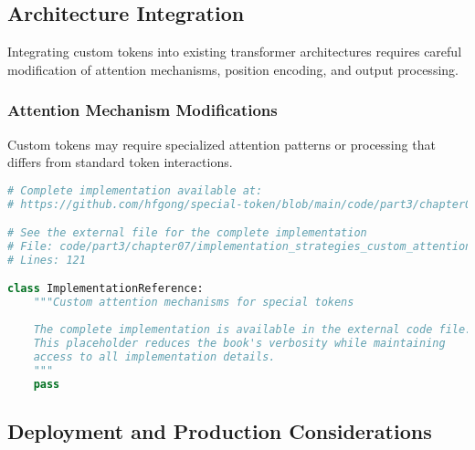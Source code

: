 \subsection{Architecture Integration}

Integrating custom tokens into existing transformer architectures requires careful modification of attention mechanisms, position encoding, and output processing.

\subsubsection{Attention Mechanism Modifications}

Custom tokens may require specialized attention patterns or processing that differs from standard token interactions.
\begin{comment}
Feedback: A brief explanation of what this means would be helpful. For example: "Sometimes, a custom token needs to behave differently in the attention mechanism. For instance, you might design a 'memory' token that can attend to all other tokens but that no other token can attend to. This requires modifying the attention mask to create a one-way information flow, allowing the token to aggregate information without broadcasting its own state."
\end{comment}

\begin{lstlisting}[language=Python, caption={Custom attention mechanisms for special tokens}]
# Complete implementation available at:
# https://github.com/hfgong/special-token/blob/main/code/part3/chapter07/implementation_strategies_custom_attention_mechanisms_fo.py

# See the external file for the complete implementation
# File: code/part3/chapter07/implementation_strategies_custom_attention_mechanisms_fo.py
# Lines: 121

class ImplementationReference:
    """Custom attention mechanisms for special tokens
    
    The complete implementation is available in the external code file.
    This placeholder reduces the book's verbosity while maintaining
    access to all implementation details.
    """
    pass
\end{lstlisting}

\subsection{Deployment and Production Considerations}

